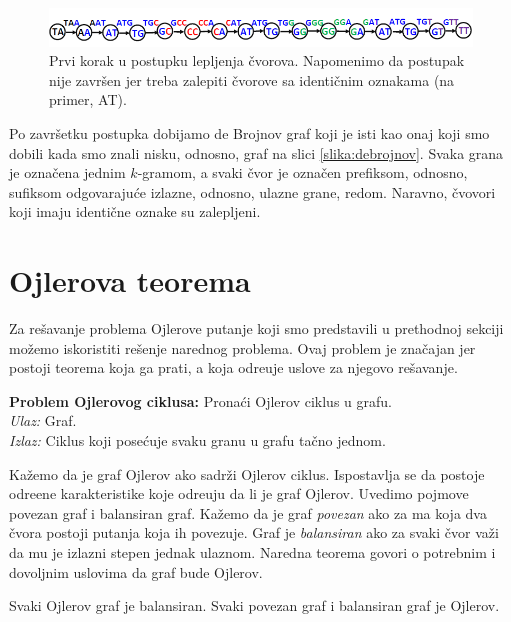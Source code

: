 \begin{figure}[h]
	\centering
	\includegraphics[width=1\textwidth]{poglavlja/3/slike/lepljenje.png}
	\caption{Prvi korak u postupku lepljenja čvorova. Napomenimo da postupak nije završen jer treba zalepiti čvorove sa identičnim oznakama (na primer, AT).}
	\label{slika:lepljenje}
\end{figure} 

Po završetku postupka dobijamo de Brojnov graf koji je isti kao onaj koji smo dobili kada smo znali nisku, odnosno, graf na slici \ref{slika:debrojnov}. Svaka grana je označena jednim $k$-gramom, a svaki čvor je označen prefiksom, odnosno, sufiksom odgovaraju\'ce izlazne, odnosno, ulazne grane, redom. Naravno, \v cvovori koji imaju identi\v cne oznake su zalepljeni.

\section{Ojlerova teorema}

Za re\v savanje problema Ojlerove putanje koji smo predstavili u prethodnoj sekciji mo\v zemo iskoristiti re\v senje narednog problema. Ovaj problem je zna\v cajan jer postoji teorema koja ga prati, a koja odre\dj uje uslove za njegovo re\v savanje.

\begin{tcolorbox}
	\textbf{Problem Ojlerovog ciklusa:} Pronaći Ojlerov ciklus u grafu. \\
	\textit{Ulaz:} Graf.\\
	\textit{Izlaz:} Ciklus koji posećuje svaku granu u grafu tačno jednom.
\end{tcolorbox}



Ka\v zemo da je graf Ojlerov ako sadr\v zi Ojlerov ciklus. Ispostavlja se da postoje odre\dj ene karakteristike koje odre\dj uju da li je graf Ojlerov. Uvedimo pojmove povezan graf i balansiran graf. Kažemo da je graf \emph{povezan} ako za ma koja dva čvora postoji putanja koja ih povezuje. Graf je \emph{balansiran} ako za svaki čvor važi da mu je izlazni stepen jednak ulaznom. Naredna teorema govori o potrebnim i dovoljnim uslovima da graf bude Ojlerov.

\begin{teorema}
	Svaki Ojlerov graf je balansiran. Svaki povezan graf i balansiran graf je Ojlerov.
\end{teorema}

